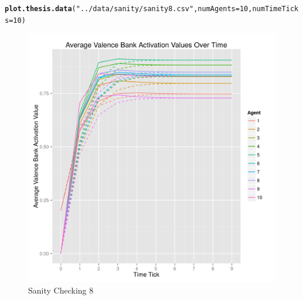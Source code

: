\documentclass{article}\usepackage[]{graphicx}\usepackage[]{color}
\makeatletter
\def\maxwidth{ %
  \ifdim\Gin@nat@width>\linewidth
    \linewidth
  \else
    \Gin@nat@width
  \fi
}
\newcommand{\hlnum}[1]{\textcolor[rgb]{0.686,0.059,0.569}{#1}}%
\newcommand{\hlstr}[1]{\textcolor[rgb]{0.192,0.494,0.8}{#1}}%
\newcommand{\hlstd}[1]{\textcolor[rgb]{0.345,0.345,0.345}{#1}}%
\newcommand{\hlkwc}[1]{\textcolor[rgb]{0.333,0.667,0.333}{#1}}%
\newcommand{\hlkwd}[1]{\textcolor[rgb]{0.737,0.353,0.396}{\textbf{#1}}}%
\newenvironment{kframe}{%
 \def\at@end@of@kframe{}%
 \ifinner\ifhmode%
  \def\at@end@of@kframe{\end{minipage}}%
  \begin{minipage}{\columnwidth}%
 \fi\fi%
 \def\FrameCommand##1{\hskip\@totalleftmargin \hskip-\fboxsep
 \colorbox{shadecolor}{##1}\hskip-\fboxsep
     \hskip-\linewidth \hskip-\@totalleftmargin \hskip\columnwidth}%
 \MakeFramed {\advance\hsize-\width
   \@totalleftmargin\z@ \linewidth\hsize
   \@setminipage}}%
 {\par\unskip\endMakeFramed%
 \at@end@of@kframe}
\newenvironment{knitrout}{}{} %
\makeatother
\begin{document}
\begin{knitrout}
\color{fgcolor}\begin{kframe}
\begin{alltt}
\hlkwd{plot.thesis.data}\hlstd{(}\hlstr{"../data/sanity/sanity8.csv"}\hlstd{,} \hlkwc{numAgents} \hlstd{=} \hlnum{10}\hlstd{,} \hlkwc{numTimeTicks} \hlstd{=} \hlnum{10}\hlstd{)}
\end{alltt}
\end{kframe}\begin{figure}[]

\includegraphics[width=\maxwidth]{figure/plot-sanity-8} \caption[Sanity Checking 8]{Sanity Checking 8\label{fig:plot-sanity-8}}
\end{figure}


\end{knitrout}


\newpage
\end{document}
